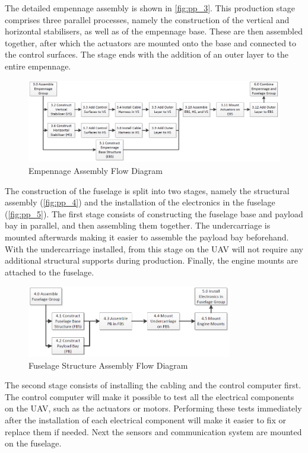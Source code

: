 The detailed empennage assembly is shown in \autoref{fig:pp_3}. This production stage comprises three parallel processes, namely the construction of the vertical and horizontal stabilisers, as well as of the empennage base. These are then assembled together, after which the actuators are mounted onto the base and connected to the control surfaces. The stage ends with the addition of an outer layer to the entire empennage.

\begin{figure}[H]
    \centering
    \includegraphics[width=\textwidth]{ProductionPlan/Figures/pp_3}
    \caption{Empennage Assembly Flow Diagram}
    \label{fig:pp_3}
\end{figure}

The construction of the fuselage is split into two stages, namely the structural assembly (\autoref{fig:pp_4}) and the installation of the electronics in the fuselage (\autoref{fig:pp_5}). The first stage consists of constructing the fuselage base and payload bay in parallel, and then assembling them together. The undercarriage is mounted afterwards making it easier to assemble the payload bay beforehand. With the undercarriage installed, from this stage on the UAV will not require any additional structural supports during production. Finally, the engine mounts are attached to the fuselage. 

\begin{figure}[H]
    \centering
    \includegraphics[width=0.8\textwidth]{ProductionPlan/Figures/pp_4}
    \caption{Fuselage Structure Assembly Flow Diagram}
    \label{fig:pp_4}
\end{figure}

The second stage consists of installing the cabling and the control computer first. The control computer will make it possible to test all the electrical components on the UAV, such as the actuators or motors. Performing these tests immediately after the installation of each electrical component will make it easier to fix or replace them if needed. Next the sensors and communication system are mounted on the fuselage.

